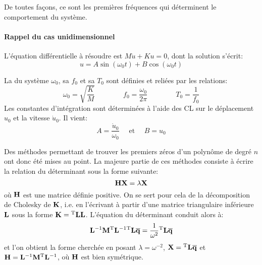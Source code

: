\medskip
{} 

De toutes façons, ce sont les premières fréquences qui déterminent le comportement du système.

\medskip
{}
\paragraph{Rappel du cas unidimensionnel}
L'équation différentielle à résoudre est $M\ddot{u}+Ku=0$,
dont la solution s'écrit: \begin{equation} u=A\sin (\omega_0 t)+B\cos(\omega_0 t) \end{equation}

La  du système $\omega_0$, sa  $f_0$
et sa  $T_0$ sont définies et reliées par les relations:
\begin{equation}
\omega_0=\sqrt{\dfrac{K}M} \qquad\qquad f_0=\dfrac{\omega_0}{2\pi} \qquad\qquad T_0=\dfrac1{f_0}
\end{equation}
Les constantes d'intégration sont déterminées à l'aide des CL sur le déplacement $u_0$ et la
vitesse $\dot{u}_0$. Il vient: \begin{equation} A=\frac{\dot{u}_0}{\omega_0} \quad\text{ et }\quad B=u_0\end{equation}

\medskip{}
Des méthodes permettant de trouver les premiers zéros d'un polynôme de degré $n$ ont donc été 
mises au point. 
La majeure partie de ces méthodes consiste à écrire la relation du déterminant sous la forme suivante:
\begin{equation} \MM{H}\VV{X}=\lambda\VV{X} \end{equation}
où $\MM{H}$ est une matrice définie positive.
\medskipvm
On se sert pour cela de la décomposition de Cholesky 
de $\MM{K}$, i.e. en l'écrivant à partir d'une matrice triangulaire inférieure $\MM{L}$ sous la forme $\MM{K}=\MMT{L}\MM{L}$.
\medskipvm
L'équation du déterminant conduit alors à:
\begin{equation} \MMI{L}\MM{M}\MMIT{L}\MMT{L}\VV{\overline{q}}=\frac1{\omega^2}\MMT{L}\VV{\overline{q}} \end{equation}
et l'on obtient la forme cherchée en posant $\lambda=\omega^{-2}$, $\VV{X}=\MMT{L}\VV{\overline{q}}$
et $\MM{H}=\MMI{L}\MM{M}\MMIT{L}$, où $\MM{H}$ est bien symétrique.

